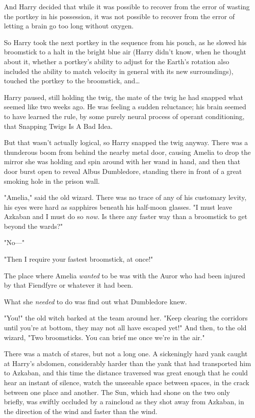 And Harry decided that while it was possible to recover from the error of 
wasting the portkey in his possession, it was not possible to recover from the 
error of letting a brain go too long without oxygen.

So Harry took the next portkey in the sequence from his pouch, as he slowed his 
broomstick to a halt in the bright blue air (Harry didn't know, when he thought 
about it, whether a portkey's ability to adjust for the Earth's rotation also 
included the ability to match velocity in general with its new surroundings), 
touched the portkey to the broomstick, and{\ldots}

Harry paused, still holding the twig, the mate of the twig he had snapped what 
seemed like two weeks ago. He was feeling a sudden reluctance; his brain seemed 
to have learned the rule, by some purely neural process of operant 
conditioning, that Snapping Twigs Is A Bad Idea.

But that wasn't actually logical, so Harry snapped the twig anyway.
\sbreak
There was a thunderous boom from behind the nearby metal door, causing Amelia 
to drop the mirror she was holding and spin around with her wand in hand, and 
then that door burst open to reveal Albus Dumbledore, standing there in front 
of a great smoking hole in the prison wall.

"Amelia," said the old wizard. There was no trace of any of his customary 
levity, his eyes were hard as sapphires beneath his half-moon glasses. "I must 
leave Azkaban and I must do so \emph{now}. Is there any faster way than a 
broomstick to get beyond the wards?"

"No---"

"Then I require your fastest broomstick, at once!"

The place where Amelia \emph{wanted} to be was with the Auror who had been 
injured by that Fiendfyre or whatever it had been.

What she \emph{needed} to do was find out what Dumbledore knew.

"You!" the old witch barked at the team around her. "Keep clearing the 
corridors until you're at bottom, they may not all have escaped yet!" And then, 
to the old wizard, "Two broomsticks. You can brief me once we're in the air."

There was a match of stares, but not a long one.
\sbreak
A sickeningly hard yank caught at Harry's abdomen, considerably harder than the 
yank that had transported him to Azkaban, and this time the distance traversed 
was great enough that he could hear an instant of silence, watch the unseeable 
space between spaces, in the crack between one place and another.
\sbreak
The Sun, which had shone on the two only briefly, was swiftly occluded by a 
raincloud as they shot away from Azkaban, in the direction of the wind and 
faster than the wind.

